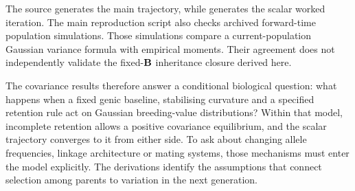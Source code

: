 The source  generates the main
trajectory, while  generates
the scalar worked iteration. The main reproduction script also checks
archived forward-time population simulations. Those simulations compare
a current-population Gaussian variance formula with empirical moments.
Their agreement does not independently validate the fixed-$\mathbf{B}$
inheritance closure derived here.

The covariance results therefore answer a conditional biological question:
what happens when a fixed genic baseline, stabilising curvature and a
specified retention rule act on Gaussian breeding-value distributions?
Within that model, incomplete retention allows a positive covariance
equilibrium, and the scalar trajectory converges to it from either side.
To ask about changing allele frequencies, linkage architecture or mating
systems, those mechanisms must enter the model explicitly. The derivations
identify the assumptions that connect selection among parents to variation
in the next generation.
